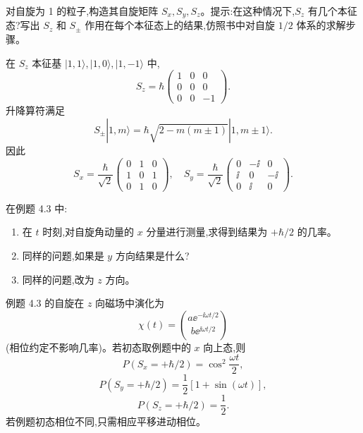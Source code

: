 \begin{question}
对自旋为 1 的粒子,构造其自旋矩阵 $S_x,S_y,S_z$。提示:在这种情况下,$S_z$ 有几个本征态?写出 $S_z$ 和 $S_\pm$ 作用在每个本征态上的结果,仿照书中对自旋 $1/2$ 体系的求解步骤。
\end{question}
\begin{solution}

在 $S_z$ 本征基 $|1,1\rangle,|1,0\rangle,|1,-1\rangle$ 中,
\[
S_z=\hbar\begin{pmatrix}1&0&0\\0&0&0\\0&0&-1\end{pmatrix}.
\]
升降算符满足
\[
S_\pm|1,m\rangle=\hbar\sqrt{2-m(m\pm1)}|1,m\pm1\rangle.
\]
因此
\[
S_x=\frac\hbar{\sqrt2}\begin{pmatrix}0&1&0\\1&0&1\\0&1&0\end{pmatrix},
\quad
S_y=\frac\hbar{\sqrt2}\begin{pmatrix}0&-\ii&0\\\ii&0&-\ii\\0&\ii&0\end{pmatrix}.
\]

\end{solution}

\begin{question}
在例题 4.3 中:
\begin{enumerate}
\item 在 $t$ 时刻,对自旋角动量的 $x$ 分量进行测量,求得到结果为 $+\hbar/2$ 的几率。
\item 同样的问题,如果是 $y$ 方向结果是什么?
\item 同样的问题,改为 $z$ 方向。
\end{enumerate}
\end{question}
\begin{solution}

例题 4.3 的自旋在 $z$ 向磁场中演化为
\[
\chi(t)=\binom{a \ee^{-\ii\omega t/2}}{b \ee^{\ii\omega t/2}}
\]
(相位约定不影响几率)。若初态取例题中的 $x$ 向上态,则
\[
P(S_x=+\hbar/2)=\cos^2\frac{\omega t}{2},
\]
\[
P(S_y=+\hbar/2)=\frac12[1+\sin(\omega t)],
\]
\[
P(S_z=+\hbar/2)=\frac12.
\]
若例题初态相位不同,只需相应平移进动相位。

\end{solution}

